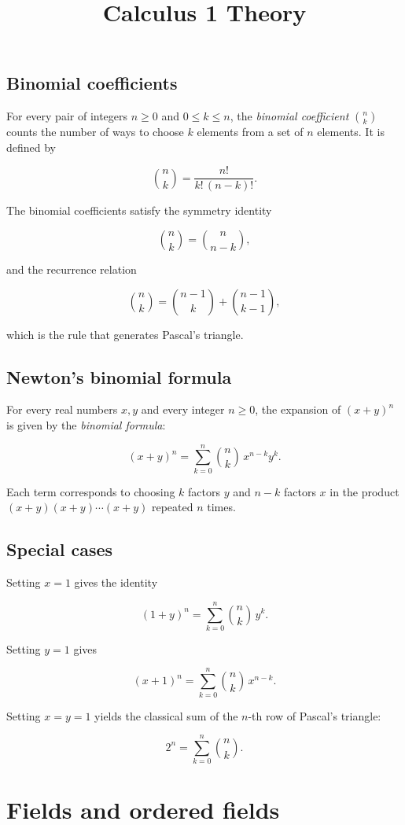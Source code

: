 \documentclass[11pt,a4paper]{article} \usepackage[T1]{fontenc}
\theoremstyle{plain} \newtheorem{theorem}{Theorem} \title{Calculus 1 Theory}
\begin{document}
\subsection*{Binomial coefficients}

For every pair of integers $n\ge 0$ and $0\le k\le n$, the \emph{binomial
coefficient} $\binom{n}{k}$ counts the number of ways to choose $k$ elements
from a set of $n$ elements. It is defined by

\[
\binom{n}{k} = \frac{n!}{k!\,(n-k)!}.
\]

The binomial coefficients satisfy the symmetry identity

\[
\binom{n}{k} = \binom{n}{n-k},
\]

and the recurrence relation

\[
\binom{n}{k} = \binom{n-1}{k} + \binom{n-1}{k-1},
\]

which is the rule that generates Pascal's triangle.

\subsection*{Newton's binomial formula}

For every real numbers $x,y$ and every integer $n\ge 0$, the expansion of
$(x+y)^n$ is given by the \emph{binomial formula}:

\[
(x+y)^n = \sum_{k=0}^{n} \binom{n}{k}\, x^{n-k} y^{k}.
\]

Each term corresponds to choosing $k$ factors $y$ and $n-k$ factors $x$ in the
product $(x+y)(x+y)\cdots(x+y)$ repeated $n$ times.

\subsection*{Special cases}

Setting $x=1$ gives the identity

\[
(1+y)^n = \sum_{k=0}^{n} \binom{n}{k}\, y^{k}.
\]

Setting $y=1$ gives

\[
(x+1)^n = \sum_{k=0}^{n} \binom{n}{k}\, x^{n-k}.
\]

Setting $x=y=1$ yields the classical sum of the $n$-th row of Pascal's
triangle:

\[
2^n = \sum_{k=0}^{n} \binom{n}{k}.
\]

\section{Fields and ordered fields}
\end{document}
